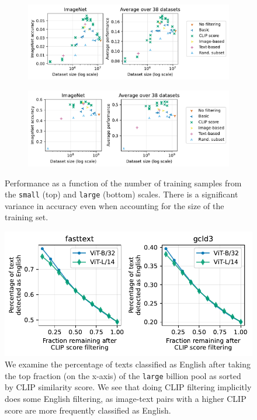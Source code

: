 \begin{figure}
    \centering
    \begin{subfigure}[b]{\textwidth}
    \includegraphics[width=.95\linewidth]{figures/train_samples_small.pdf}
\end{subfigure}
\begin{subfigure}[b]{\textwidth}
    \includegraphics[width=.95\linewidth]{figures/train_samples_large.pdf}
\end{subfigure}
\caption{Performance as a function of the number of training samples from the {\small\texttt{small}} (top) and {\small\texttt{large}} (bottom) scales. There is a significant variance in accuracy even when accounting for the size of the training set.}
    \label{fig:training-samples-extra}
\end{figure}


\begin{figure}
    \centering
    \includegraphics[width=0.75\linewidth]{figures/clip_filter_english.pdf}
    \caption{We examine the percentage of texts classified as English after taking the top fraction (on the x-axis) of the {\small \texttt{large}} billion pool as sorted by CLIP similarity score. We see that doing CLIP filtering implicitly does some English filtering, as image-text pairs with a higher CLIP score are more frequently classified as English.}
    \label{fig:clip_english}
\end{figure}

